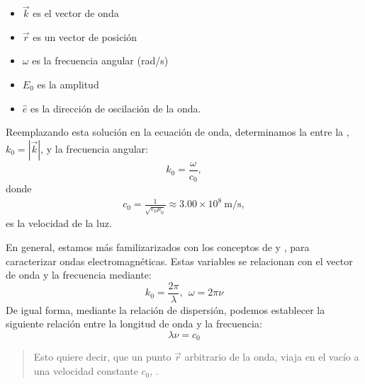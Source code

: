 \documentclass[letterpaper,10pt,english]{jupyterBook}
\begin{document}
\begin{itemize}
\item {} 
\sphinxAtStartPar
\(\vec{k}\) es el vector de onda

\item {} 
\sphinxAtStartPar
\(\vec{r}\) es un vector de posición

\item {} 
\sphinxAtStartPar
\(\omega\) es la frecuencia angular (rad/s)

\item {} 
\sphinxAtStartPar
\(E_0\) es la amplitud

\item {} 
\sphinxAtStartPar
\(\hat{e}\) es la dirección de oscilación de la onda.

\end{itemize}

\sphinxAtStartPar
Reemplazando esta solución en la ecuación de onda, determinamos la  entre la , \(k_0 = |\vec{k}|\), y la frecuencia angular:
\label{equation:1_ondas_electromagneticas/1_ondas_electromagneticas:dd1f4072-7140-434f-a81b-d2c9957fc57c}\begin{equation}
k_0 = \frac{\omega}{c_0},
\end{equation}
\sphinxAtStartPar
donde
\begin{equation*}
\begin{split}c_0 = \frac{1}{\sqrt{\varepsilon_0\mu_0}} \approx 3.00\times10^8~\mathrm{m/s,}\end{split}
\end{equation*}
\sphinxAtStartPar
es la velocidad de la luz.

\sphinxAtStartPar
En general, estamos más familizarizados con los conceptos de  y , para caracterizar ondas electromagnéticas. Estas variables se relacionan con el vector de onda y la frecuencia mediante:
\label{equation:1_ondas_electromagneticas/1_ondas_electromagneticas:7be6f4ec-fa31-4186-a78c-9c70866688b5}\begin{equation}
k_0 = \frac{2\pi}{\lambda}, ~~ \omega = 2\pi\nu
\end{equation}
\sphinxAtStartPar
De igual forma, mediante la relación de dispersión, podemos establecer la siguiente relación entre la longitud de onda y la frecuencia:
\label{equation:1_ondas_electromagneticas/1_ondas_electromagneticas:05129d32-7f10-4608-80c7-cbf79ab2717c}\begin{equation}
\lambda\nu = c_0
\end{equation}\begin{quote}

\sphinxAtStartPar
Esto quiere decir, que un punto \(\vec{r}\) arbitrario de la onda, viaja en el vacío a una velocidad constante \(c_0\), .
\end{quote}
\end{document}
